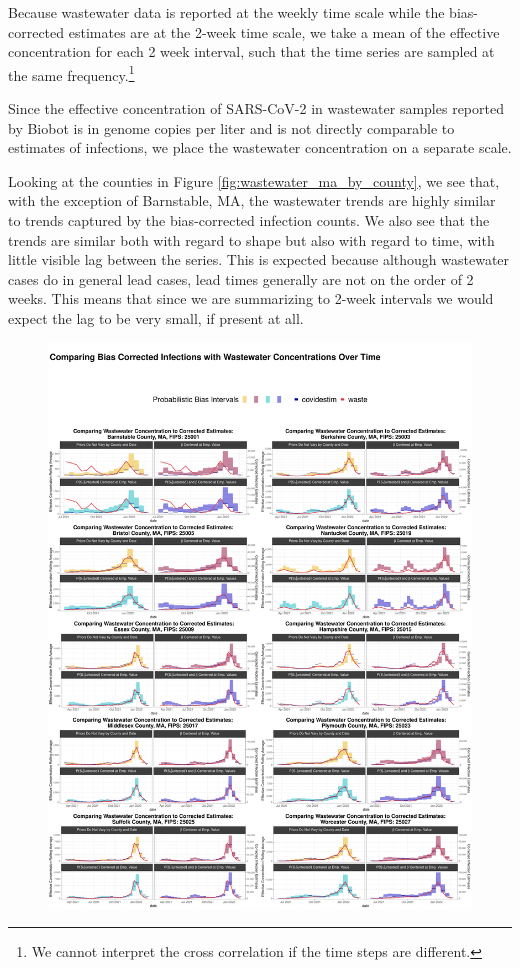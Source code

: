 \documentclass[12pt,twoside]{smiththesis}
\begin{document}
Because wastewater data is reported at the weekly time scale while the bias-corrected estimates are at the 2-week time scale, we take a mean of the effective concentration for each 2 week interval, such that the time series are sampled at the same frequency.\footnote{We cannot interpret the cross correlation if the time steps are different.}

Since the effective concentration of SARS-CoV-2 in wastewater samples reported by Biobot is in genome copies per liter and is not directly comparable to estimates of infections, we place the wastewater concentration on a separate scale.

Looking at the counties in Figure \ref{fig:wastewater_ma_by_county}, we see that, with the exception of Barnstable, MA, the wastewater trends are highly similar to trends captured by the bias-corrected infection counts. We also see that the trends are similar both with regard to shape but also with regard to time, with little visible lag between the series. This is expected because although wastewater cases do in general lead cases, lead times generally are not on the order of 2 weeks. This means that since we are summarizing to 2-week intervals we would expect the lag to be very small, if present at all.
\begin{figure}
\includegraphics[width=1\linewidth]{figure/wastewater_ma_by_county} \caption{\label{fig:wastewater_ma_by_county}}\label{fig:unnamed-chunk-101}
\end{figure}
\end{document}
